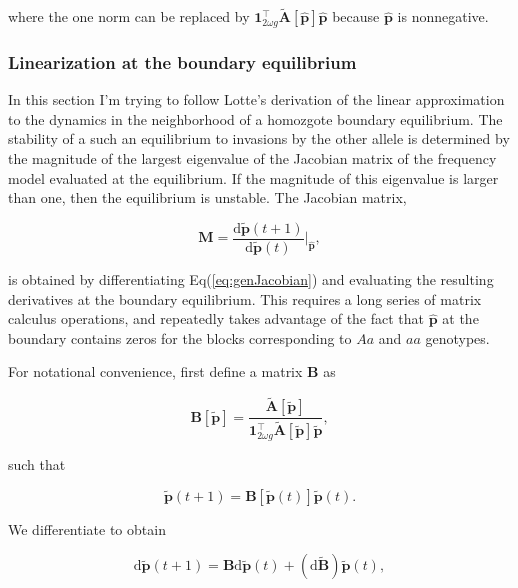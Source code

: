 \documentclass[11pt]{article}
\def\mbf#1{\mathbf{#1}}
\begin{document}
\noindent where the one norm can be replaced by $\mbf{1}^{\intercal}_{2 \omega g} \tilde{\mbf{A}}[\hat{\mbf{p}}] \hat{\mbf{p}}$ because $\hat{\mbf{p}}$ is nonnegative.


\subsubsection*{Linearization at the boundary equilibrium}

In this section I'm trying to follow Lotte's derivation of the linear approximation to the dynamics in the neighborhood of a homozgote boundary equilibrium. The stability of a such an equilibrium to invasions by the other allele is determined by the magnitude of the largest eigenvalue of the Jacobian matrix of the frequency model evaluated at the equilibrium. If the magnitude of this eigenvalue is larger than one, then the equilibrium is unstable. The Jacobian matrix,

\begin{equation} \label{eq:genJacobian}
	\mbf{M} =  \frac{ \text{d} \tilde{\mbf{p}}(t + 1) }{ \text{d} \tilde{\mbf{p}}(t) } \bigg\rvert_{\hat{\mbf{p}}},
\end{equation}

\noindent is obtained by differentiating Eq(\ref{eq:genJacobian}) and evaluating the resulting derivatives at the boundary equilibrium. This requires a long series of matrix calculus operations, and repeatedly takes advantage of the fact that $\hat{\mbf{p}}$ at the boundary contains zeros for the blocks corresponding to $Aa$ and $aa$ genotypes.

For notational convenience, first define a matrix $\mbf{B}$ as

\begin{equation}
	\mbf{B}[\tilde{\mbf{p}}] = \frac{ \tilde{\mbf{A}}[\tilde{\mbf{p}}] }{ \mbf{1}^{\intercal}_{2 \omega g} \tilde{\mbf{A}}[\tilde{\mbf{p}}] \tilde{\mbf{p}}},
\end{equation}

\noindent such that 

\begin{equation} 
	\tilde{\mbf{p}}(t + 1) = \mbf{B}[\tilde{\mbf{p}}(t)]\tilde{\mbf{p}}(t).
\end{equation}

\noindent We differentiate to obtain

\begin{equation} 
	\text{d} \tilde{\mbf{p}}(t + 1) = \mbf{B}\text{d} \tilde{\mbf{p}}(t) + \left(\text{d} \tilde{\mbf{B}} \right) \tilde{\mbf{p}}(t),
\end{equation}
\end{document}
